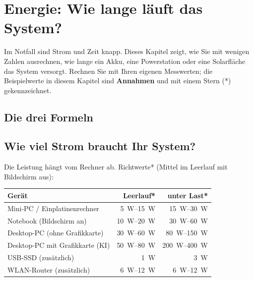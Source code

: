 \chapter{Energie: Wie lange läuft das System?}

Im Notfall sind Strom und Zeit knapp. Dieses Kapitel zeigt, wie Sie mit wenigen Zahlen ausrechnen, wie lange ein Akku, eine Powerstation oder eine Solarfläche das System versorgt. Rechnen Sie mit Ihren eigenen Messwerten; die Beispielwerte in diesem Kapitel sind \textbf{Annahmen} und mit einem Stern (*) gekennzeichnet.

\section{Die drei Formeln}

\section{Wie viel Strom braucht Ihr System?}
Die Leistung hängt vom Rechner ab. Richtwerte* (Mittel im Leerlauf mit Bildschirm aus):

\begin{center}\small
\renewcommand{\arraystretch}{1.25}
\begin{tabular}{@{}lrr@{}}
\toprule
\textbf{Gerät} & \textbf{Leerlauf*} & \textbf{unter Last*} \\
\midrule
Mini-PC / Einplatinenrechner & \SIrange{5}{15}{W} & \SIrange{15}{30}{W} \\
Notebook (Bildschirm an) & \SIrange{10}{20}{W} & \SIrange{30}{60}{W} \\
Desktop-PC (ohne Grafikkarte) & \SIrange{30}{60}{W} & \SIrange{80}{150}{W} \\
Desktop-PC mit Grafikkarte (KI) & \SIrange{50}{80}{W} & \SIrange{200}{400}{W} \\
USB-SSD (zusätzlich) & \SI{1}{W} & \SI{3}{W} \\
WLAN-Router (zusätzlich) & \SIrange{6}{12}{W} & \SIrange{6}{12}{W} \\
\bottomrule
\end{tabular}
\end{center}

